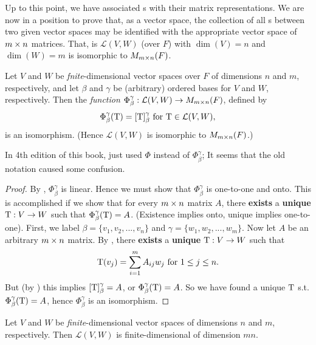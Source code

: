Up to this point, we have associated \LTRAN{}s with their matrix representations.
We are now in a position to prove that, as a vector space, the collection of all \LTRAN{}s between two given vector
spaces may be identified with the appropriate vector space of \(m \times n\) matrices.
That, is \(\mathcal{L}(V, W)\) (over \(F\)) with \(\dim(V) = n\) and \(\dim(W) = m\) is isomorphic to \(M_{m \times n}(F)\).

\begin{theorem} \label{thm 2.20}
Let \(V\) and \(W\) be \emph{fnite}-dimensional vector spaces over \(F\) of dimensions \(n\) and \(m\), respectively,
and let \(\beta\) and \(\gamma\) be (arbitrary) ordered bases for \(V\) and \(W\), respectively.
Then the \emph{function} \(\Phi_{\beta}^{\gamma}: \mathcal{L}(V, W) \to M_{m \times n}(F)\), defined by
\[
    \Phi_{\beta}^{\gamma}(\mathrm{T}) = [\mathrm{T}]_{\beta}^{\gamma} \text{ for } \mathrm{T} \in \mathcal{L}(V, W),
\]
is an isomorphism.
(Hence \(\mathcal{L}(V, W)\) is isomorphic to \(M_{m \times n}(F)\).)
\end{theorem}

\begin{note}
In 4th edition of this book,  just used \(\Phi\) instead of \(\Phi_{\beta}^{\gamma}\);
It seems that the old notation caused some confusion.
\end{note}

\begin{proof}
By , \(\Phi_{\beta}^{\gamma}\) is linear.
Hence we must show that \(\Phi_{\beta}^{\gamma}\) is one-to-one and onto.
This is accomplished if we show that for every \(m \times n\) matrix \(A\), there \textbf{exists} a \textbf{unique} \LTRAN{} \(\mathrm{T} : V \to W\) such that \(\Phi_{\beta}^{\gamma}(\mathrm{T}) = A\).
(Existence implies onto, unique implies one-to-one).
First, we label \(\beta = \{ v_1, v_2, ..., v_n \}\) and \(\gamma = \{ w_1, w_2, ..., w_m \}\).
Now let \(A\) be an arbitrary \(m \times n\) matrix.
By , there \textbf{exists} a \textbf{unique} \LTRAN{} \(\mathrm{T}: V \to W\) such that
\[
    \mathrm{T}(v_j) = \sum_{i = 1}^{m} A_{ij} w_j \text{ for } 1 \le j \le n.
\]
But (by ) this implies \([\mathrm{T}]_{\beta}^{\gamma} = A\), or \(\Phi_{\beta}^{\gamma}(\mathrm{T}) = A\).
So we have found a unique \(\mathrm{T}\) s.t. \(\Phi_{\beta}^{\gamma}(\mathrm{T}) = A\), hence \(\Phi_{\beta}^{\gamma}\) is an isomorphism.
\end{proof}

\begin{corollary} \label{corollary 2.20.1}
Let \(V\) and \(W\) be \emph{finite}-dimensional vector spaces of dimensions \(n\) and \(m\), respectively.
Then \(\mathcal{L}(V, W)\) is finite-dimensional of dimension \(mn\).
\end{corollary}

